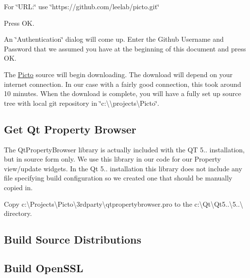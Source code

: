 \begin{DoxyEnumerate}
\begin{DoxyEnumerate}
\begin{DoxyEnumerate}
\item For \char`\"{}\-U\-R\-L\-:\char`\"{} use \char`\"{}https\-://github.\-com/leelab/picto.\-git\char`\"{}
\item Press O\-K.
\item An \char`\"{}\-Authentication\char`\"{} dialog will come up. Enter the Github Username and Password that we assumed you have at the beginning of this document and press O\-K.
\item The \hyperlink{namespace_picto}{Picto} source will begin downloading. The download will depend on your internet connection. In our case with a fairly good connection, this took around 10 minutes. When the download is complete, you will have a fully set up source tree with local git repository in \char`\"{}c\-:\textbackslash{}\textbackslash{}projects\textbackslash{}\-Picto\char`\"{}.
\end{DoxyEnumerate}
\end{DoxyEnumerate}
\end{DoxyEnumerate}\hypertarget{build_environment_preparation_get_prop_browser}{}\subsection{Get Qt Property Browser}\label{build_environment_preparation_get_prop_browser}
The Qt\-Property\-Browser library is actually included with the Q\-T 5.. installation, but in source form only. We use this library in our code for our Property view/update widgets. In the Qt 5.. installation this library does not include any file specifying build configuration so we created one that should be manually copied in.


\begin{DoxyEnumerate}
\item Copy c\-:\textbackslash{}Projects\textbackslash{}\-Picto\textbackslash{}3rdparty\textbackslash{}qtpropertybrowser.\-pro to the c\-:\textbackslash{}Qt\textbackslash{}\-Qt5..\textbackslash{}5..\textbackslash{} directory.
\end{DoxyEnumerate}\hypertarget{build_environment_preparation_build_src_dist}{}\subsection{Build Source Distributions}\label{build_environment_preparation_build_src_dist}
\hypertarget{build_environment_preparation_build_openssl}{}\subsection{Build Open\-S\-S\-L}\label{build_environment_preparation_build_openssl}


